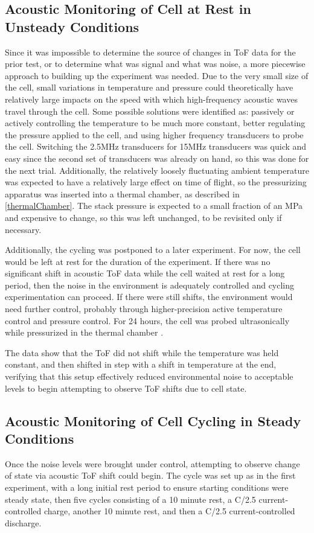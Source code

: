 \subsection{Acoustic Monitoring of Cell at Rest in Unsteady Conditions}\label{chamberTest}
Since it was impossible to determine the source of changes in ToF data for the prior test, or to determine what was signal and what was noise, a more piecewise approach to building up the experiment was needed. Due to the very small size of the cell, small variations in temperature and pressure could theoretically have relatively large impacts on the speed with which high-frequency acoustic waves travel through the cell. Some possible solutions were identified as: passively or actively controlling the temperature to be much more constant, better regulating the pressure applied to the cell, and using higher frequency transducers to probe the cell. Switching the 2.5MHz transducers for 15MHz transducers was quick and easy since the second set of transducers was already on hand, so this was done for the next trial. Additionally, the relatively loosely fluctuating ambient temperature was expected to have a relatively large effect on time of flight, so the pressurizing apparatus was inserted into a thermal chamber, as described in \hyperref[thermalChamber]{\cref{thermalChamber}}. The stack pressure is expected to a small fraction of an MPa and expensive to change, so this was left unchanged, to be revisited only if necessary.

Additionally, the cycling was postponed to a later experiment.
For now, the cell would be left at rest for the duration of the experiment. 
If there was no significant shift in acoustic ToF data while the cell waited at rest for a long period, then the noise in the environment is adequately controlled and cycling experimentation can proceed. 
If there were still shifts, the environment would need further control, probably through higher-precision active temperature control and pressure control. 
For 24 hours, the cell was probed ultrasonically while pressurized in the thermal chamber .

The data show that the ToF did not shift while the temperature was held constant, and then shifted in step with a shift in temperature at the end, verifying that this setup effectively reduced environmental noise to acceptable levels to begin attempting to observe ToF shifts due to cell state.

\subsection{Acoustic Monitoring of Cell Cycling in Steady Conditions}
Once the noise levels were brought under control, attempting to observe change of state via acoustic ToF shift could begin. The cycle was set up as in the first experiment, with a long initial rest period to ensure starting conditions were steady state, then five cycles consisting of a 10 minute rest, a C/2.5 current-controlled charge, another 10 minute rest, and then a C/2.5 current-controlled discharge. 

